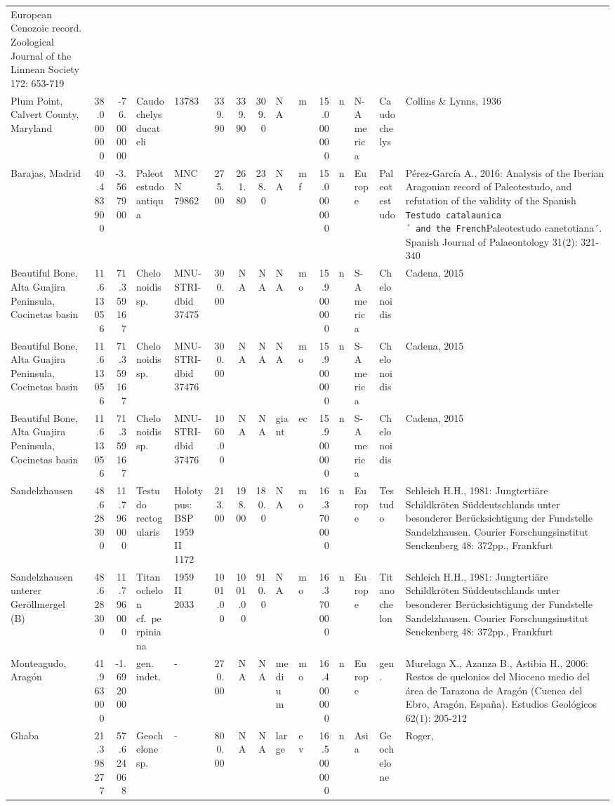 \documentclass[]{article}
\begin{document}
\begin{longtable}[]{@{}lrrllrrrllrllll@{}}
European Cenozoic record. Zoological Journal of the Linnean Society 172:
653-719\tabularnewline
Plum Point, Calvert County, Maryland & 38.000000 & -76.000000 &
Caudochelys ducateli & 13783 & 339.90 & 339.90 & 309.0 & NA & m &
15.000000 & n & N-America & Caudochelys & Collins \& Lynns,
1936\tabularnewline
Barajas, Madrid & 40.483900 & -3.567900 & Paleotestudo antiqua & MNCN
79862 & 275.00 & 261.80 & 238.0 & NA & mf & 15.000000 & n & Europe &
Paleotestudo & Pérez-García A., 2016: Analysis of the Iberian Aragonian
record of Paleotestudo, and refutation of the validity of the Spanish
\texttt{Testudo\ catalaunica´\ and\ the\ French}Paleotestudo
canetotiana´. Spanish Journal of Palaeontology 31(2):
321-340\tabularnewline
Beautiful Bone, Alta Guajira Peninsula, Cocinetas basin & 11.613056 &
71.359167 & Chelonoidis sp. & MNU-STRI-dbid 37475 & 300.00 & NA & NA &
NA & mo & 15.900000 & n & S-America & Chelonoidis & Cadena,
2015\tabularnewline
Beautiful Bone, Alta Guajira Peninsula, Cocinetas basin & 11.613056 &
71.359167 & Chelonoidis sp. & MNU-STRI-dbid 37476 & 300.00 & NA & NA &
NA & mo & 15.900000 & n & S-America & Chelonoidis & Cadena,
2015\tabularnewline
Beautiful Bone, Alta Guajira Peninsula, Cocinetas basin & 11.613056 &
71.359167 & Chelonoidis sp. & MNU-STRI-dbid 37476 & 1060.00 & NA & NA &
giant & ec & 15.900000 & n & S-America & Chelonoidis & Cadena,
2015\tabularnewline
Sandelzhausen & 48.628300 & 11.796000 & Testudo rectogularis &
Holotypus: BSP 1959 II 1172 & 213.00 & 198.00 & 180.0 & NA & mo &
16.370000 & n & Europe & Testudo & Schleich H.H., 1981: Jungtertiäre
Schildkröten Süddeutschlands unter besonderer Berücksichtigung der
Fundstelle Sandelzhausen. Courier Forschungsinstitut Senckenberg 48:
372pp., Frankfurt\tabularnewline
Sandelzhausen unterer Geröllmergel (B) & 48.628300 & 11.796000 &
Titanochelon cf.~perpiniana & 1959 II 2033 & 1001.00 & 1001.00 & 910.0 &
NA & mo & 16.370000 & n & Europe & Titanochelon & Schleich H.H., 1981:
Jungtertiäre Schildkröten Süddeutschlands unter besonderer
Berücksichtigung der Fundstelle Sandelzhausen. Courier
Forschungsinstitut Senckenberg 48: 372pp., Frankfurt\tabularnewline
Monteagudo, Aragón & 41.963000 & -1.692000 & gen. indet. & - & 270.00 &
NA & NA & medium & mo & 16.400000 & n & Europe & gen. & Murelaga X.,
Azanza B., Astibia H., 2006: Restos de quelonios del Mioceno medio del
área de Tarazona de Aragón (Cuenca del Ebro, Aragón, España). Estudios
Geológicos 62(1): 205-212\tabularnewline
Ghaba & 21.398277 & 57.624068 & Geochelone sp. & - & 800.00 & NA & NA &
large & ev & 16.500000 & n & Asia & Geochelone & Roger,

\end{longtable}
\end{document}

